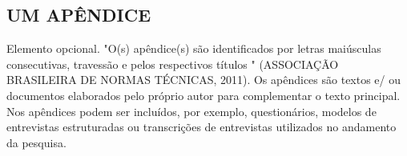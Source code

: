 \begin{apendicesenv}
\partapendices

	\chapter{UM APÊNDICE}
	\label{ap:umalabel}
	
		Elemento opcional. "O(s) apêndice(s) são identificados por letras
		maiúsculas consecutivas, travessão e pelos respectivos títulos " (ASSOCIAÇÃO BRASILEIRA DE NORMAS TÉCNICAS, 2011). Os apêndices são textos e/ ou documentos elaborados pelo próprio autor para complementar o texto principal. Nos apêndices podem ser incluídos, por exemplo, questionários, modelos de entrevistas estruturadas ou transcrições de entrevistas utilizados
		no andamento da pesquisa.
		
	
\end{apendicesenv}